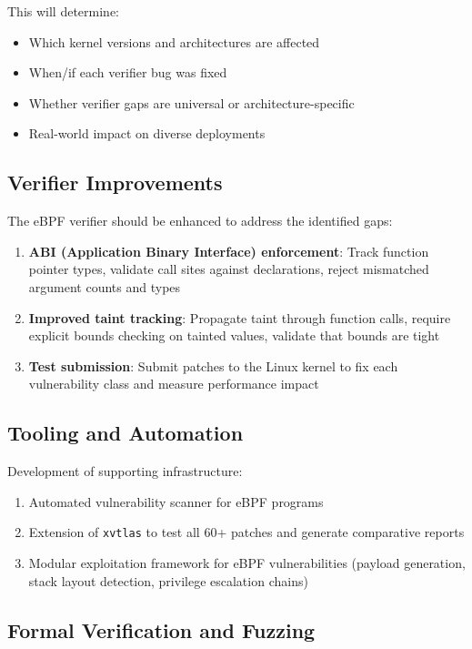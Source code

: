 This will determine:
\begin{itemize}
  \item Which kernel versions and architectures are affected
  \item When/if each verifier bug was fixed
  \item Whether verifier gaps are universal or architecture-specific
  \item Real-world impact on diverse deployments
\end{itemize}

\subsection{Verifier Improvements}

The eBPF verifier should be enhanced to address the identified gaps:

\begin{enumerate}[label=\arabic*.]
  \item \textbf{ABI (Application Binary Interface) enforcement}: Track function pointer types, validate call sites against declarations, reject mismatched argument counts and types
  \item \textbf{Improved taint tracking}: Propagate taint through function calls, require explicit bounds checking on tainted values, validate that bounds are tight
  \item \textbf{Test submission}: Submit patches to the Linux kernel to fix each vulnerability class and measure performance impact
\end{enumerate}

\subsection{Tooling and Automation}

Development of supporting infrastructure:

\begin{enumerate}[label=\arabic*.]
  \item Automated vulnerability scanner for eBPF programs
  \item Extension of \texttt{xvtlas} to test all 60+ patches and generate comparative reports
  \item Modular exploitation framework for eBPF vulnerabilities (payload generation, stack layout detection, privilege escalation chains)
\end{enumerate}

\subsection{Formal Verification and Fuzzing}

